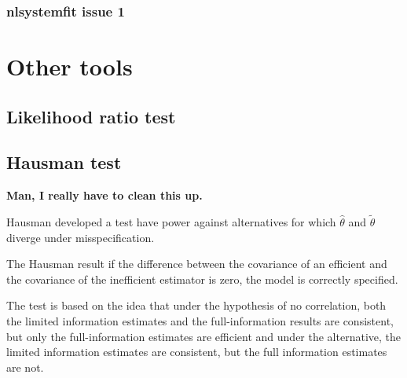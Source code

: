 \documentclass[article]{jss}
\begin{document}
\subsubsection{nlsystemfit issue 1}




\section{Other tools}


  
\subsection{Likelihood ratio test}

\subsection{Hausman test}

\textbf{Man, I really have to clean this up.}

Hausman \citep{hausman1978} developed a test have power against
alternatives for which $\hat{\theta}$ and $\tilde{\theta}$ diverge
under misspecification.

The Hausman result if the difference between the covariance of an
efficient and the covariance of the inefficient estimator is zero, the
model is correctly specified.  

The test is based on the idea that under the hypothesis of no
correlation, both the limited information estimates and the
full-information results are consistent, but only the full-information
estimates are efficient and under the alternative, the limited
information estimates are consistent, but the full information
estimates are not. 
\end{document}
